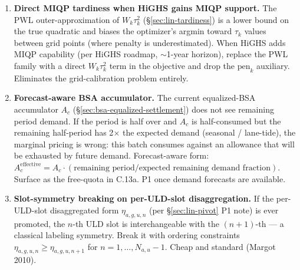 \documentclass[11pt,a4paper]{article}
\theoremstyle{definition}
\begin{document}
\begin{enumerate}
{        refinement within PER} (e.g., pharma sub-bands $+2$ to $+8\,^\circ$C
        vs $+15$ to $+25\,^\circ$C). The structural form for this is a
        \emph{poset} on temperature regimes (pharma $\preceq$ chilled
        $\preceq$ ambient, where $\preceq$ means ``validation envelope
        contains''): HAWBs share a MAWB if their temperature tuples agree
        on the infimum. Still a partition (the equivalence class is
        ``shipments that agree on the infimum''), but the partition's
        cells are coarser than naive sub-banding. P1 design pass for
        $g(\cdot)$ refinement.
  \item \label{item:miqp-tardiness} \textbf{Direct MIQP tardiness when
        HiGHS gains MIQP support.} The PWL outer-approximation of
        $W_k \tau_k^2$ (\S\ref{sec:lin-tardiness}) is a lower bound on
        the true quadratic and biases the optimizer's argmin toward
        $\tau_k$ values between grid points (where penalty is
        underestimated). When HiGHS adds MIQP capability (per HiGHS
        roadmap, $\sim$1-year horizon), replace the PWL family with a
        direct $W_k \tau_k^2$ term in the objective and drop the
        $\text{pen}_k$ auxiliary. Eliminates the grid-calibration
        problem entirely.
  \item \label{item:forecast-aware-accumulator} \textbf{Forecast-aware BSA
        accumulator.} The current equalized-BSA accumulator $A_c$
        (\S\ref{sec:bsa-equalized-settlement}) does not see remaining
        period demand. If the period is half over and $A_c$ is
        half-consumed but the remaining half-period has 2$\times$ the
        expected demand (seasonal / lane-tide), the marginal pricing is
        wrong: this batch consumes against an allowance that will be
        exhausted by future demand. Forecast-aware form:
        $A_c^{\text{effective}} = A_c \cdot (\text{remaining period} /
        \text{expected remaining demand fraction})$. Surface as the
        free-quota in C.13a. P1 once demand forecasts are available.
  \item \label{item:slot-symmetry-breaking} \textbf{Slot-symmetry
        breaking on per-ULD-slot disaggregation.} If the per-ULD-slot
        disaggregated form $\eta_{a,g,u,n}$ (per
        \S\ref{sec:lin-pivot} P1 note) is ever promoted, the
        $n$-th ULD slot is interchangeable with the $(n+1)$-th --- a
        classical labeling symmetry. Break it with ordering constraints
        $\eta_{a,g,u,n} \geq \eta_{a,g,u,n+1}$ for $n = 1, \ldots,
        N_{a,u} - 1$. Cheap and standard (Margot 2010).

\end{enumerate}
\end{document}
